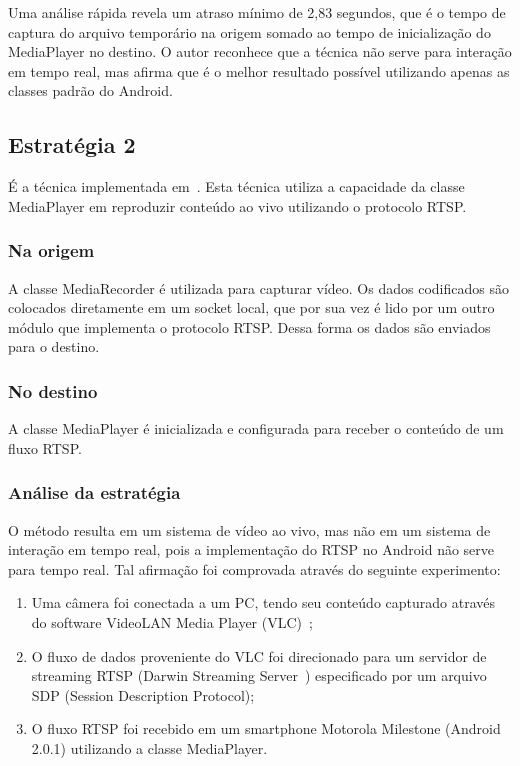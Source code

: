 \documentclass{acm_proc_article-sp}
\begin{document}
Uma análise rápida revela um atraso mínimo de 2,83 segundos, que é o tempo de captura do arquivo temporário na origem somado ao tempo de inicialização do MediaPlayer no destino. O autor reconhece que a técnica não serve para interação em tempo real, mas afirma que é o melhor resultado possível utilizando apenas as classes padrão do Android.

\subsection{Estratégia 2}
É a técnica implementada em~\cite{sipdroid}. Esta técnica utiliza a capacidade da classe MediaPlayer em reproduzir conteúdo ao vivo utilizando o protocolo RTSP.

\subsubsection{Na origem}
A classe MediaRecorder é utilizada para capturar vídeo. Os dados codificados são colocados diretamente em um socket local, que por sua vez é lido por um outro módulo que implementa o protocolo RTSP. Dessa forma os dados são enviados para o destino.

\subsubsection{No destino}
A classe MediaPlayer é inicializada e configurada para receber o conteúdo de um fluxo RTSP.

\subsubsection{Análise da estratégia}
O método resulta em um sistema de vídeo ao vivo, mas não em um sistema de interação em tempo real, pois a implementação do RTSP no Android não serve para tempo real. Tal afirmação foi comprovada através do seguinte experimento:

\begin{enumerate}
 \item Uma câmera foi conectada a um PC, tendo seu conteúdo capturado através do software VideoLAN Media Player (VLC)~\cite{VLC};
 \item O fluxo de dados proveniente do VLC foi direcionado para um servidor de streaming RTSP (Darwin Streaming Server~\cite{DSS}) especificado por um arquivo SDP (Session Description Protocol);
 \item O fluxo RTSP foi recebido em um smartphone Motorola Milestone (Android 2.0.1) utilizando a classe MediaPlayer.
\end{enumerate}
\end{document}
